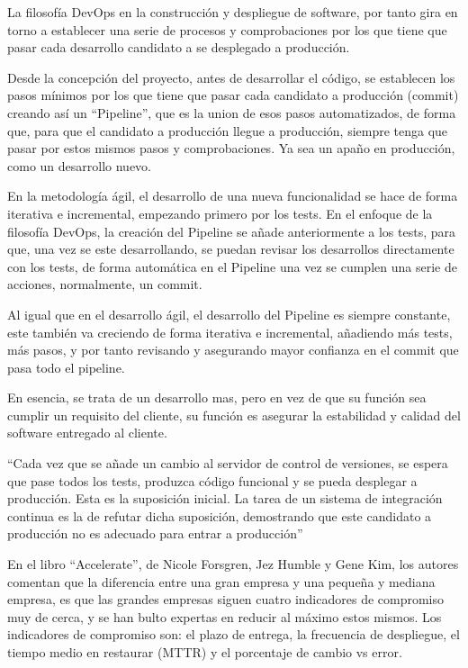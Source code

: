 \documentclass[12pt]{report} %
\begin{document}
La filosofía DevOps en la construcción y despliegue de software, por tanto gira
en torno a establecer una serie de procesos y comprobaciones por los que tiene
que pasar cada desarrollo candidato a se desplegado a producción. 

Desde la concepción del proyecto, antes de desarrollar el código, se establecen
los pasos mínimos por los que tiene que pasar cada candidato a producción
(commit) creando así un ``Pipeline'', que es la union de esos pasos
automatizados, de forma que, para que el candidato a producción llegue a
producción, siempre tenga que pasar por estos mismos pasos y comprobaciones.  Ya
sea un apaño en producción, como un desarrollo nuevo.

En la metodología ágil, el desarrollo de una nueva funcionalidad se hace de
forma iterativa e incremental, empezando primero por los tests.  En el enfoque
de la filosofía DevOps, la creación del Pipeline se añade anteriormente a los
tests, para que, una vez se este desarrollando, se puedan revisar los
desarrollos directamente con los tests, de forma automática en el Pipeline una
vez se cumplen una serie de acciones, normalmente, un commit.

Al igual que en el desarrollo ágil, el desarrollo del Pipeline es siempre
constante, este también va creciendo de forma iterativa e incremental, añadiendo
más tests, más pasos, y por tanto revisando y asegurando mayor confianza en el
commit que pasa todo el pipeline.

En esencia, se trata de un desarrollo mas, pero en vez de que su función sea
cumplir un requisito del cliente, su función es asegurar la estabilidad y
calidad del software entregado al cliente. 

``Cada vez que se añade un cambio al servidor de control de versiones, se espera
que pase todos los tests, produzca código funcional y se pueda desplegar a
producción.  Esta es la suposición inicial.  La tarea de un sistema de
integración continua es la de refutar dicha suposición, demostrando que este
candidato a producción no es adecuado para entrar a
producción''\cite{Humble2010}

En el libro ``Accelerate'', de Nicole Forsgren, Jez Humble y Gene Kim, los
autores comentan que la diferencia entre una gran empresa y una pequeña y
mediana empresa, es que las grandes empresas siguen cuatro indicadores de
compromiso muy de cerca, y se han bulto expertas en reducir al máximo estos
mismos.  Los indicadores de compromiso son: el plazo de entrega, la frecuencia
de despliegue, el tiempo medio en restaurar (MTTR) y el porcentaje de cambio vs
error.\cite{Forsgren2018}
\end{document}

